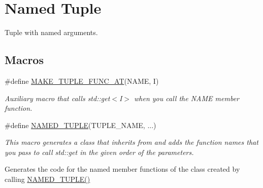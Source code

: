 \hypertarget{group__NamedTupleGroup}{}\section{Named Tuple}
\label{group__NamedTupleGroup}


Tuple with named arguments.  


\subsection*{Macros}
\begin{DoxyCompactItemize}
\item 
\#define \hyperlink{group__NamedTupleGroup_ga5563afddd885651b3122846917c2ccb9}{M\+A\+K\+E\+\_\+\+T\+U\+P\+L\+E\+\_\+\+F\+U\+N\+C\+\_\+\+AT}(N\+A\+ME,  I)
\begin{DoxyCompactList}\small\item\em Auxiliary macro that calls std\+::get$<$\+I$>$ when you call the {\ttfamily N\+A\+ME} member function. \end{DoxyCompactList}\item 
\#define \hyperlink{group__NamedTupleGroup_ga8d77d3a6a4df5f11e3c9d23294c6ddf1}{N\+A\+M\+E\+D\+\_\+\+T\+U\+P\+LE}(T\+U\+P\+L\+E\+\_\+\+N\+A\+ME, ...)
\begin{DoxyCompactList}\small\item\em This macro generates a class that inherits from \textquotesingle{} and adds the function names that you pass to call std\+::get in the given order of the parameters. \end{DoxyCompactList}\end{DoxyCompactItemize}
\label{_amgrp01747264fe7bf50731df0522c351974e}%
Generates the code for the named member functions of the class created by calling \hyperlink{group__NamedTupleGroup_ga8d77d3a6a4df5f11e3c9d23294c6ddf1}{N\+A\+M\+E\+D\+\_\+\+T\+U\+P\+L\+E()}

